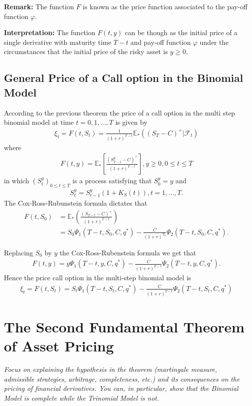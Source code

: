\documentclass{article}
\theoremstyle{definition}
\numberwithin{equation}{section}
\begin{document}
\textbf{Remark: } The function $F$ is known as the price function associated to the pay-off function $\varphi$. 

\textbf{Interpretation: } The function $F(t,y)$ can be though as the initial price of a single derivative with maturity time $T-t$ and pay-off function $\varphi$ under the circumstances that the initial price of the risky asset is $y \geq 0$. 

\subsection{General Price of a Call option in the Binomial Model}
According to the previous theorem the price of a call option in the multi step binomial model at time $t = 0,1, \ldots, T$ is given by 
\begin{align}
    \xi_t = F(t, S_t) = \frac{1}{(1+r)^{T-t}} \mathbb{E}_* \left( (S_T - C)^+ | \mathscr{F}_t \right)
\end{align}
where 
\begin{align}
    F(t,y) = \mathbb{E}_* \left[ \frac{(S_{T-t}^y - C)^+}{(1+r)^{T-t}} \right], y \geq 0, 0 \leq t \leq T
\end{align}
in which $(S_t^y)_{0 \leq t \leq T}$ is a process satisfying that $S_0^y = y$ and 
\begin{align}
    S_t^y = S_{t-1}^y(1 + K_S(t)), t = 1, \ldots, T. 
\end{align}
The Cox-Ross-Rubunstein formula dictates that 
\begin{align}
    F(t, S_0) &= \mathbb{E}_* \left(  \frac{(S_{T-t} - C)^+}{(1+r)^{T-t}} \right)\\
    &= S_0 \Psi_1 (T-t, S_0, C, q^*) - \frac{C}{(1+r)^{T_0}} \Psi_2(T-t, S_0, C, q^*).
\end{align}

Replacing $S_0$ by $y$ the Cox-Ross-Rubenstein formula we get that 
\begin{align}
    F(t, y) = y \Psi_1 (T-t, y, C, q^*) - \frac{C}{(1+r)^{T-t}}\Psi_2(T-t, y, C, q^*). 
\end{align}
Hence the price call option in the multi-step binomial model is 
\begin{align}
    \xi_t = F(t, S_t) = S_t \Psi_1(T-t, S_t,C, q^*) - \frac{C}{(1+r)^{T-t}} \Psi_2(T-t, S_t, C, q^*)
\end{align}

\newpage

\section{The Second Fundamental Theorem of Asset Pricing}
\textit{Focus on explaining the hypothesis in the theorem (martingale measure, admissible strategies, arbitrage, completeness, etc.) and its consequences on the pricing of financial derivatives. You can, in particular, show that the Binomial Model is complete while the Trinomial Model is not.}
\end{document}
